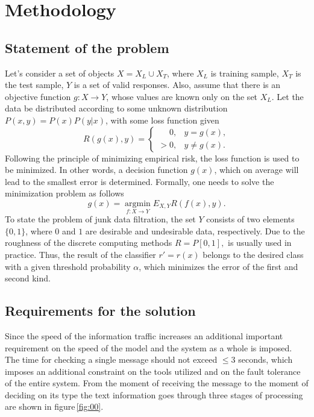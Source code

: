 \documentclass[a4paper]{jpconf}
\begin{document}
\section{Methodology}
\subsection{Statement of the problem}
Let's consider a set of objects $ X = X_L \cup X_T$, where
$X_L$ is training sample,
$X_T$ is the test sample,
$Y$ is a set of valid responses. Also, assume that there is an objective function $g: X \rightarrow Y$, whose values are known only on the set $X_L$. Let the data be distributed according to some unknown distribution $P (x,y) = P(x) P (y|x)$, with some loss function given
$$
R(g(x), y) = 
\begin{cases} 
	\phantom{>}0, & y = g(x), \\
	> 0, & y \neq g(x).
\end{cases}
$$
Following the principle of minimizing empirical risk, the loss function is used to be minimized. In other words, a decision function $g(x)$, which on average will lead to the smallest error is determined. Formally, one needs to solve the minimization problem as follows
$$
g(x) = \operatorname*{argmin}_{f: X \rightarrow Y} E_{X,Y} R(f(x), y).
$$
To state the problem of junk data filtration, the set $Y$ consists of two elements $\{0, 1\}$, where $0$ and $1$ are desirable and undesirable data, respectively. Due to the roughness of the discrete computing methods $R = P[0, 1], $ is usually used in practice. Thus, the result of the classifier $r' = r(x)$ belongs to the desired class with a given threshold probability $\alpha$, which minimizes the error of the first and second kind.

\subsection{Requirements for the solution}
Since the speed of the information traffic increases an additional important requirement on the speed of the model and the system as a whole is imposed. The time for checking a single message should not exceed $\leqslant3$ seconds, which imposes an additional constraint on the tools utilized and on the fault tolerance of the entire system.
From the moment of receiving the message to the moment of deciding on its type the text information goes through three stages of processing are shown in figure\,\ref{fig:00}.
\end{document}
